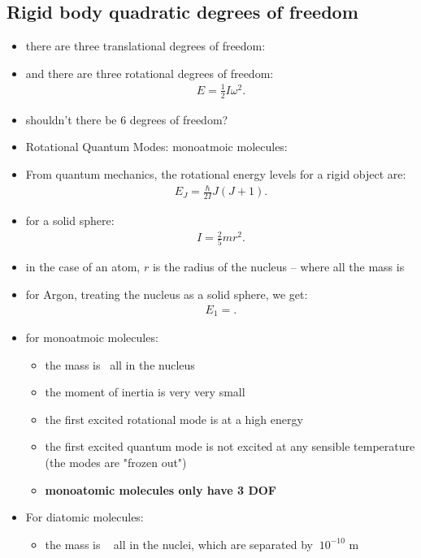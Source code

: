 \documentclass[10pt]{article}
\begin{document}
\subsection{Rigid body quadratic degrees of freedom}
\begin{itemize}
    \item there are three translational degrees of freedom:
    \item and there are three rotational degrees of freedom:
    \begin{align*}
        E = \frac{1}{2}I\omega^2
    .\end{align*}
\item shouldn't there be 6 degrees of freedom?
\item Rotational Quantum Modes: monoatmoic molecules:
\item From quantum mechanics, the rotational energy levels for a rigid object are:
    \begin{align*}
        E_J = \frac{\hbar}{2I}J(J+1)
    .\end{align*}
\item for a solid sphere:
    \begin{align*}
        I = \frac{2}{5}mr^2
    .\end{align*}
\item in the case of an atom, $r$ is the radius of the nucleus -- where all the mass is
\item for Argon, treating the nucleus as a solid sphere, we get:
    \begin{align*}
        E_1 = 
    .\end{align*}
\item for monoatmoic molecules:
    \begin{itemize}
        \item the mass is ~all in the nucleus
        \item the moment of inertia is very very small
        \item the first excited rotational mode is at a high energy
        \item the first excited quantum mode is not excited at any sensible temperature (the modes are "frozen out")
        \item \textbf{monoatomic molecules only have 3 DOF} 
    \end{itemize}
\item For diatomic molecules:
    \begin{itemize}
        \item the mass is ~ all in the nuclei, which are separated by $~10^{-10}$ m

\end{itemize}
\end{itemize}
\end{document}

